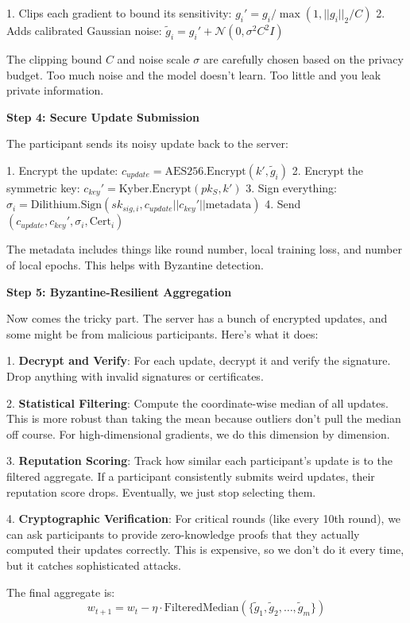 \documentclass[onecolumn,11pt]{article}
\begin{document}
1. Clips each gradient to bound its sensitivity: $g_i' = g_i / \max(1, ||g_i||_2 / C)$
2. Adds calibrated Gaussian noise: $\tilde{g}_i = g_i' + \mathcal{N}(0, \sigma^2 C^2 I)$

The clipping bound $C$ and noise scale $\sigma$ are carefully chosen based on the privacy budget. Too much noise and the model doesn't learn. Too little and you leak private information.

\textbf{Step 4: Secure Update Submission}

The participant sends its noisy update back to the server:

1. Encrypt the update: $c_{update} = \text{AES256.Encrypt}(k', \tilde{g}_i)$
2. Encrypt the symmetric key: $c_{key}' = \text{Kyber.Encrypt}(pk_S, k')$
3. Sign everything: $\sigma_i = \text{Dilithium.Sign}(sk_{sig,i}, c_{update} || c_{key}' || \text{metadata})$
4. Send $(c_{update}, c_{key}', \sigma_i, \text{Cert}_i)$

The metadata includes things like round number, local training loss, and number of local epochs. This helps with Byzantine detection.

\textbf{Step 5: Byzantine-Resilient Aggregation}

Now comes the tricky part. The server has a bunch of encrypted updates, and some might be from malicious participants. Here's what it does:

1. \textbf{Decrypt and Verify}: For each update, decrypt it and verify the signature. Drop anything with invalid signatures or certificates.

2. \textbf{Statistical Filtering}: Compute the coordinate-wise median of all updates. This is more robust than taking the mean because outliers don't pull the median off course. For high-dimensional gradients, we do this dimension by dimension.

3. \textbf{Reputation Scoring}: Track how similar each participant's update is to the filtered aggregate. If a participant consistently submits weird updates, their reputation score drops. Eventually, we just stop selecting them.

4. \textbf{Cryptographic Verification}: For critical rounds (like every 10th round), we can ask participants to provide zero-knowledge proofs that they actually computed their updates correctly. This is expensive, so we don't do it every time, but it catches sophisticated attacks.

The final aggregate is:
$$w_{t+1} = w_t - \eta \cdot \text{FilteredMedian}(\{\tilde{g}_1, \tilde{g}_2, \ldots, \tilde{g}_m\})$$
\end{document}
